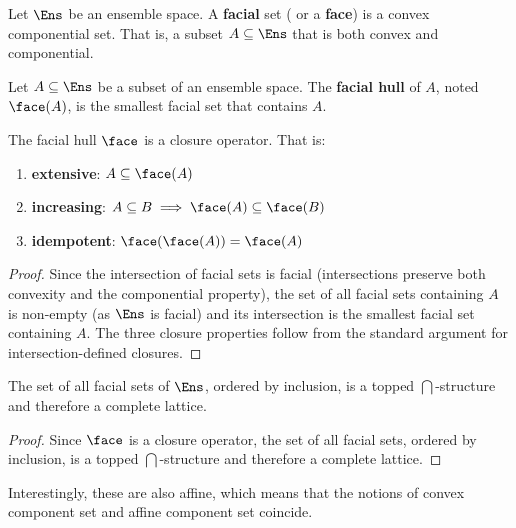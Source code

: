 \begin{mathSection}
	\begin{defn}
		Let $\Ens$ be an ensemble space. A \textbf{facial} set ( or a \textbf{face}) is a convex componential set. That is, a subset $A \subseteq \Ens$ that is both convex and componential.
	\end{defn}
	
	\begin{defn}
		Let $A \subseteq \Ens$ be a subset of an ensemble space. The \textbf{facial hull} of $A$, noted $\face(A)$, is the smallest facial set that contains $A$.
	\end{defn}
	
	\begin{prop}
		The facial hull $\face$ is a closure operator. That is:
		\begin{enumerate}
			\item \textbf{extensive}: $A \subseteq \face(A)$
			\item \textbf{increasing}: $A \subseteq B \implies \face(A) \subseteq \face(B)$
			\item \textbf{idempotent}: $\face(\face(A)) = \face(A)$
		\end{enumerate}
	\end{prop}
	
	\begin{proof}
		Since the intersection of facial sets is facial (intersections preserve both convexity and the componential property), the set of all facial sets containing $A$ is non-empty (as $\Ens$ is facial) and its intersection is the smallest facial set containing $A$. The three closure properties follow from the standard argument for intersection-defined closures.
	\end{proof}
	
	\begin{prop}
		The set of all facial sets of $\Ens$, ordered by inclusion, is a topped $\bigcap$-structure and therefore a complete lattice.
	\end{prop}
	
	\begin{proof}
		Since $\face$ is a closure operator, the set of all facial sets, ordered by inclusion, is a topped $\bigcap$-structure and therefore a complete lattice.
	\end{proof}
	
\end{mathSection}

 Interestingly, these are also affine, which means that the notions of convex component set and affine component set coincide.

